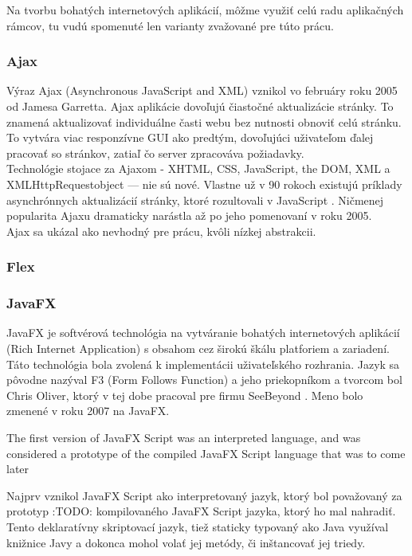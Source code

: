 Na tvorbu bohatých internetových aplikácií, môžme využiť celú radu aplikačných rámcov, tu vudú spomenuté len varianty zvažované pre túto prácu.

\subsubsection{Ajax}

Výraz Ajax (Asynchronous JavaScript and XML) vznikol vo februáry roku 2005 od Jamesa Garretta. Ajax aplikácie dovoľujú čiastočné aktualizácie stránky. To znamená aktualizovať individuálne časti webu bez nutnosti obnoviť celú stránku. To vytvára viac responzívne GUI ako predtým, dovoľujúci uživateľom ďalej pracovať so stránkov, zatiaľ čo server zpracováva požiadavky. \\

Technológie stojace za Ajaxom - XHTML, CSS, JavaScript, the DOM, XML a XMLHttpRequestobject — nie sú nové. Vlastne už v 90 rokoch existujú príklady asynchrónnych aktualizácií stránky, ktoré rozultovali v JavaScript \cite{deitel2008ajax}. Ničmenej popularita Ajaxu dramaticky narástla až po jeho pomenovaní v roku 2005. \\

Ajax sa ukázal ako nevhodný pre prácu, kvôli nízkej abstrakcii.

\subsubsection{Flex}

\subsubsection{JavaFX}
 JavaFX je softvérová technológia na vytváranie bohatých internetových aplikácií (Rich Internet Application) s obsahom cez širokú škálu platforiem a zariadení.
Táto technológia bola zvolená k implementácii uživateľského rozhrania. Jazyk sa pôvodne nazýval F3 (Form Follows Function) a jeho priekopníkom a tvorcom bol Chris Oliver, ktorý v tej dobe pracoval pre firmu SeeBeyond \cite{dea2011javafx}. Meno bolo zmenené v roku 2007 na JavaFX. \cite{anderson2009essential}

The first version of JavaFX Script was an interpreted language, and was considered a prototype of the compiled JavaFX Script language that was to come later

Najprv vznikol JavaFX Script ako interpretovaný jazyk, ktorý bol považovaný za prototyp :TODO: kompilovaného JavaFX Script jazyka, ktorý ho mal nahradiť. Tento deklaratívny skriptovací jazyk, tiež staticky typovaný ako Java využíval knižnice Javy a dokonca mohol volať jej metódy, či inštancovať jej triedy. \cite{weaver2007javafx}


